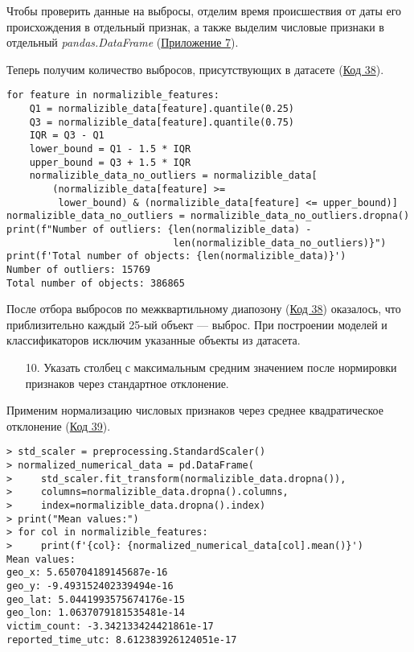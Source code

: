 Чтобы проверить данные на выбросы, отделим время происшествия от даты его происхождения в отдельный признак, а также выделим числовые признаки в отдельный \textit{pandas.DataFrame} (\hyperref[appendix:7]{Приложение 7}).

Теперь получим количество выбросов, присутствующих в датасете (\hyperref[code:38]{Код 38}).

\begin{code}
\begin{verbatim}
for feature in normalizible_features:
    Q1 = normalizible_data[feature].quantile(0.25)
    Q3 = normalizible_data[feature].quantile(0.75)
    IQR = Q3 - Q1
    lower_bound = Q1 - 1.5 * IQR
    upper_bound = Q3 + 1.5 * IQR
    normalizible_data_no_outliers = normalizible_data[
        (normalizible_data[feature] >=
         lower_bound) & (normalizible_data[feature] <= upper_bound)]
normalizible_data_no_outliers = normalizible_data_no_outliers.dropna()
print(f"Number of outliers: {len(normalizible_data) -
                             len(normalizible_data_no_outliers)}")
print(f'Total number of objects: {len(normalizible_data)}')
Number of outliers: 15769
Total number of objects: 386865
\end{verbatim}
\label{code:38}
\end{code}

После отбора выбросов по межквартильному диапозону (\hyperref[code:38]{Код 38}) оказалось, что приблизительно каждый 25-ый объект --- выброс. При построении моделей и классификаторов исключим указанные объекты из датасета.

\begin{enumerate}
    \item[10.] Указать столбец с максимальным средним значением после нормировки признаков через стандартное отклонение.
\end{enumerate}

Применим нормализацию числовых признаков через среднее квадратическое отклонение (\hyperref[code:39]{Код 39}).

\begin{code}
\begin{verbatim}
> std_scaler = preprocessing.StandardScaler()
> normalized_numerical_data = pd.DataFrame(
>     std_scaler.fit_transform(normalizible_data.dropna()),
>     columns=normalizible_data.dropna().columns,
>     index=normalizible_data.dropna().index)
> print("Mean values:")
> for col in normalizible_features:
>     print(f'{col}: {normalized_numerical_data[col].mean()}')
Mean values:
geo_x: 5.650704189145687e-16
geo_y: -9.493152402339494e-16
geo_lat: 5.0441993575674176e-15
geo_lon: 1.0637079181535481e-14
victim_count: -3.342133424421861e-17
reported_time_utc: 8.612383926124051e-17
\end{verbatim}
\label{code:39}
\end{code}

